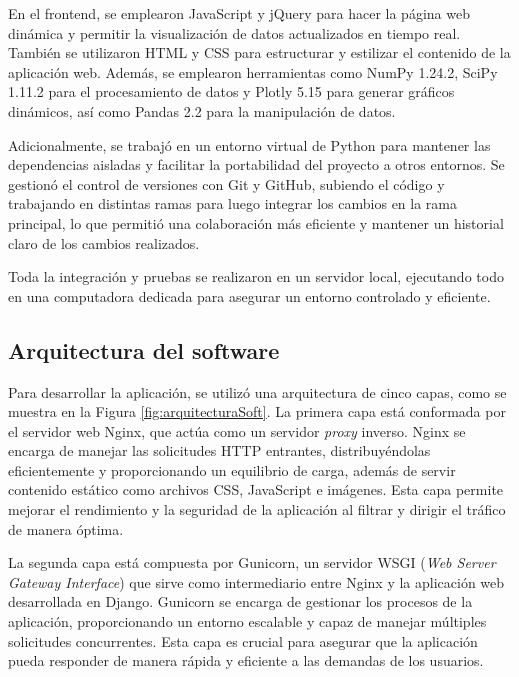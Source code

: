 En el frontend, se emplearon JavaScript y jQuery para hacer la página web dinámica y permitir la visualización de datos actualizados en tiempo real. También se utilizaron HTML y CSS para estructurar y estilizar el contenido de la aplicación web. Además, se emplearon herramientas como NumPy 1.24.2, SciPy  1.11.2 para el procesamiento de datos y Plotly 5.15 para generar gráficos dinámicos, así como Pandas 2.2 para la manipulación de datos.

Adicionalmente, se trabajó en un entorno virtual de Python para mantener las dependencias aisladas y facilitar la portabilidad del proyecto a otros entornos. Se gestionó el control de versiones con Git y GitHub, subiendo el código y trabajando en distintas ramas para luego integrar los cambios en la rama principal, lo que permitió una colaboración más eficiente y mantener un historial claro de los cambios realizados.

Toda la integración y pruebas se realizaron en un servidor local, ejecutando todo en una computadora dedicada para asegurar un entorno controlado y eficiente. 


\subsection{Arquitectura del software}
Para desarrollar la aplicación, se utilizó una arquitectura de cinco capas, como se muestra en la Figura \ref{fig:arquitecturaSoft}. La primera capa está conformada por el servidor web Nginx, que actúa como un servidor \textit{proxy} inverso. Nginx se encarga de manejar las solicitudes HTTP entrantes, distribuyéndolas eficientemente y proporcionando un equilibrio de carga, además de servir contenido estático como archivos CSS, JavaScript e imágenes. Esta capa permite mejorar el rendimiento y la seguridad de la aplicación al filtrar y dirigir el tráfico de manera óptima.

La segunda capa está compuesta por Gunicorn, un servidor WSGI (\textit{Web Server Gateway Interface}) que sirve como intermediario entre Nginx y la aplicación web desarrollada en Django. Gunicorn se encarga de gestionar los procesos de la aplicación, proporcionando un entorno escalable y capaz de manejar múltiples solicitudes concurrentes. Esta capa es crucial para asegurar que la aplicación pueda responder de manera rápida y eficiente a las demandas de los usuarios.

